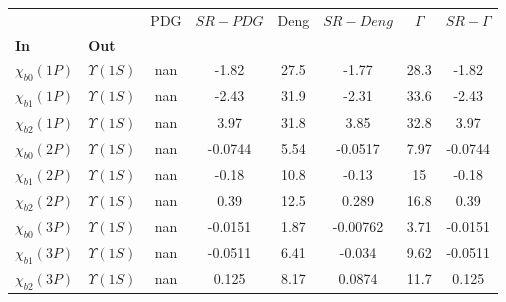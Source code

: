 \begin{tabular}{l|l|c|c|c|c|c|c}
\toprule
                &                &  PDG & $SR-PDG$ &  Deng & $SR-Deng$ &  $\Gamma$ & $SR-\Gamma$ \\
\textbf{In} & \textbf{Out} &      &          &       &           &           &             \\
\midrule
\textbf{$\chi_{b0}(1P)$} & \textbf{$\Upsilon(1S)$} &  nan &    -1.82 &  27.5 &     -1.77 &      28.3 &       -1.82 \\
\textbf{$\chi_{b1}(1P)$} & \textbf{$\Upsilon(1S)$} &  nan &    -2.43 &  31.9 &     -2.31 &      33.6 &       -2.43 \\
\textbf{$\chi_{b2}(1P)$} & \textbf{$\Upsilon(1S)$} &  nan &     3.97 &  31.8 &      3.85 &      32.8 &        3.97 \\
\textbf{$\chi_{b0}(2P)$} & \textbf{$\Upsilon(1S)$} &  nan &  -0.0744 &  5.54 &   -0.0517 &      7.97 &     -0.0744 \\
\textbf{$\chi_{b1}(2P)$} & \textbf{$\Upsilon(1S)$} &  nan &    -0.18 &  10.8 &     -0.13 &        15 &       -0.18 \\
\textbf{$\chi_{b2}(2P)$} & \textbf{$\Upsilon(1S)$} &  nan &     0.39 &  12.5 &     0.289 &      16.8 &        0.39 \\
\textbf{$\chi_{b0}(3P)$} & \textbf{$\Upsilon(1S)$} &  nan &  -0.0151 &  1.87 &  -0.00762 &      3.71 &     -0.0151 \\
\textbf{$\chi_{b1}(3P)$} & \textbf{$\Upsilon(1S)$} &  nan &  -0.0511 &  6.41 &    -0.034 &      9.62 &     -0.0511 \\
\textbf{$\chi_{b2}(3P)$} & \textbf{$\Upsilon(1S)$} &  nan &    0.125 &  8.17 &    0.0874 &      11.7 &       0.125 \\
\bottomrule
\end{tabular}

